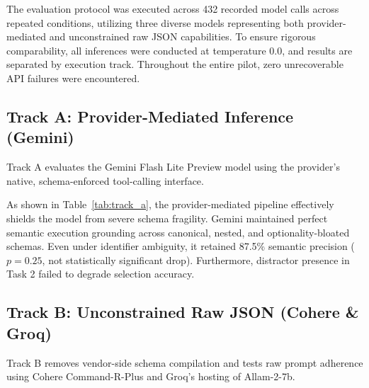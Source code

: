 \documentclass[10pt,conference]{IEEEtran}
\begin{document}
The evaluation protocol was executed across 432 recorded model calls across repeated conditions, utilizing three diverse models representing both provider-mediated and unconstrained raw JSON capabilities. To ensure rigorous comparability, all inferences were conducted at temperature 0.0, and results are separated by execution track. Throughout the entire pilot, zero unrecoverable API failures were encountered.

\subsection{Track A: Provider-Mediated Inference (Gemini)}
Track A evaluates the Gemini Flash Lite Preview model using the provider's native, schema-enforced tool-calling interface. 

\begin{table}[h]
\centering
\caption{Track A (Gemini 3.1 Flash Lite Preview) - Task 1 Semantics \& Task 2 Selection}
\label{tab:track_a}
\end{table}

As shown in Table~\ref{tab:track_a}, the provider-mediated pipeline effectively shields the model from severe schema fragility. Gemini maintained perfect semantic execution grounding across canonical, nested, and optionality-bloated schemas. Even under identifier ambiguity, it retained 87.5\% semantic precision ($p = 0.25$, not statistically significant drop). Furthermore, distractor presence in Task 2 failed to degrade selection accuracy.

\subsection{Track B: Unconstrained Raw JSON (Cohere \& Groq)}
Track B removes vendor-side schema compilation and tests raw prompt adherence using Cohere Command-R-Plus and Groq's hosting of Allam-2-7b.
\end{document}
